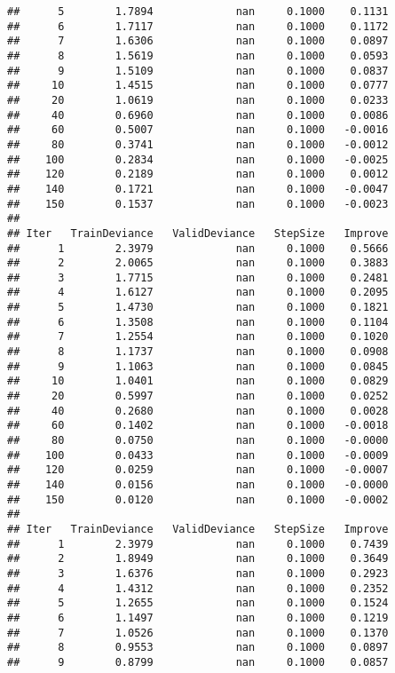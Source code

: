 \documentclass[]{article}
\begin{document}
\begin{verbatim}
##      5        1.7894             nan     0.1000    0.1131
##      6        1.7117             nan     0.1000    0.1172
##      7        1.6306             nan     0.1000    0.0897
##      8        1.5619             nan     0.1000    0.0593
##      9        1.5109             nan     0.1000    0.0837
##     10        1.4515             nan     0.1000    0.0777
##     20        1.0619             nan     0.1000    0.0233
##     40        0.6960             nan     0.1000    0.0086
##     60        0.5007             nan     0.1000   -0.0016
##     80        0.3741             nan     0.1000   -0.0012
##    100        0.2834             nan     0.1000   -0.0025
##    120        0.2189             nan     0.1000    0.0012
##    140        0.1721             nan     0.1000   -0.0047
##    150        0.1537             nan     0.1000   -0.0023
## 
## Iter   TrainDeviance   ValidDeviance   StepSize   Improve
##      1        2.3979             nan     0.1000    0.5666
##      2        2.0065             nan     0.1000    0.3883
##      3        1.7715             nan     0.1000    0.2481
##      4        1.6127             nan     0.1000    0.2095
##      5        1.4730             nan     0.1000    0.1821
##      6        1.3508             nan     0.1000    0.1104
##      7        1.2554             nan     0.1000    0.1020
##      8        1.1737             nan     0.1000    0.0908
##      9        1.1063             nan     0.1000    0.0845
##     10        1.0401             nan     0.1000    0.0829
##     20        0.5997             nan     0.1000    0.0252
##     40        0.2680             nan     0.1000    0.0028
##     60        0.1402             nan     0.1000   -0.0018
##     80        0.0750             nan     0.1000   -0.0000
##    100        0.0433             nan     0.1000   -0.0009
##    120        0.0259             nan     0.1000   -0.0007
##    140        0.0156             nan     0.1000   -0.0000
##    150        0.0120             nan     0.1000   -0.0002
## 
## Iter   TrainDeviance   ValidDeviance   StepSize   Improve
##      1        2.3979             nan     0.1000    0.7439
##      2        1.8949             nan     0.1000    0.3649
##      3        1.6376             nan     0.1000    0.2923
##      4        1.4312             nan     0.1000    0.2352
##      5        1.2655             nan     0.1000    0.1524
##      6        1.1497             nan     0.1000    0.1219
##      7        1.0526             nan     0.1000    0.1370
##      8        0.9553             nan     0.1000    0.0897
##      9        0.8799             nan     0.1000    0.0857

\end{verbatim}
\end{document}
